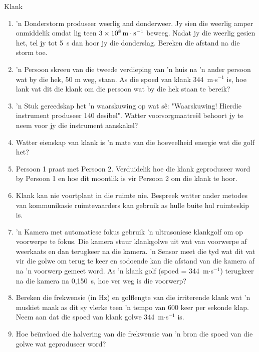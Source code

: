 \begin{eocexercises}{Klank}
\begin{enumerate}[noitemsep, label=\textbf{\arabic*}. ]
\item 'n Donderstorm produseer weerlig and donderweer. Jy sien die weerlig amper onmiddelik omdat lig teen $3\ensuremath{\times}{10}^{8}\phantom{\rule{0.166667em}{0ex}}\text{m}\ensuremath{\cdot}{\text{s}}^{-1}$ beweeg. Nadat jy die weerlig gesien het, tel jy tot 5~s dan hoor jy die donderslag. Bereken die afstand na die storm toe.

\item 'n Persoon skreeu van die tweede verdieping van 'n huis na 'n ander persoon wat by die hek, 50 m weg, staan. As die spoed van klank 344~m$\ensuremath{\cdot}$s${}^{-1}$ is, hoe lank vat dit die klank om die persoon wat by die hek staan te bereik?

\item  'n Stuk gereedskap het 'n waarskuwing op wat s\^e: "Waarskuwing! Hierdie instrument produseer 140 desibel". Watter voorsorgmaatre\"el behoort jy te neem voor jy die instrument aanskakel?

\item Watter eienskap van klank is 'n mate van die hoeveelheid energie wat die golf het?

\item Persoon 1 praat met Persoon 2. Verduidelik hoe die klank geproduseer word by Persoon 1 en hoe dit moontlik is vir Persoon 2 om die klank te hoor.

\item Klank kan nie voortplant in die ruimte nie. Bespreek watter ander metodes van kommunikasie ruimtevaarders kan gebruik as hulle buite hul ruimteskip is.

\item 'n Kamera met automatiese fokus gebruik 'n ultrasoniese klankgolf om op voorwerpe te fokus. Die kamera stuur klankgolwe uit wat van voorwerpe af weerkaats en dan terugkeer na die kamera. 'n Sensor meet die tyd wat dit vat vir die golwe om terug te keer en sodoende kan die afstand van die kamera af na 'n voorwerp gemeet word. As 'n klank golf (spoed = 344~m$\ensuremath{\cdot}$s${}^{-1}$) terugkeer na die kamera na 0,150~s, hoe ver weg is die voorwerp?

\item Bereken die frekwensie (in Hz) en golflengte van die irriterende klank wat 'n muskiet maak as dit sy vlerke teen 'n tempo van 600 keer per sekonde klap. Neem aan dat die spoed van klank golwe 344~m$\ensuremath{\cdot}$s${}^{-1}$ is.

\item Hoe be\"invloed die halvering van die frekwensie van 'n bron die spoed van die golwe wat geproduseer word?


\end{enumerate}
\end{eocexercises}
